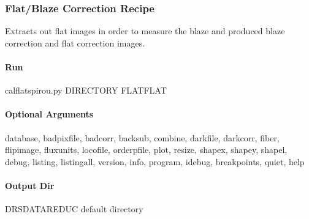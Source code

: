 \documentclass[a4paper,10pt,english]{report}
\begin{document}
\subsubsection{Flat/Blaze Correction Recipe}
\label{\detokenize{user/spirou/recipes/flat_blaze:flat-blaze-correction-recipe}}\label{\detokenize{user/spirou/recipes/flat_blaze:recipes-spirou-flat-blaze}}\label{\detokenize{user/spirou/recipes/flat_blaze::doc}}
Extracts out flat images in order to measure the blaze and produced blaze
correction and flat correction images.


\paragraph{Run}
\label{\detokenize{user/spirou/recipes/flat_blaze:run}}
\begin{sphinxVerbatim}[commandchars=\\\{\}]
cal\PYGZus{}flat\PYGZus{}spirou.py \PYG{o}{[}DIRECTORY\PYG{o}{]} \PYG{o}{[}FLAT\PYGZus{}FLAT\PYG{o}{]}
\end{sphinxVerbatim}


\paragraph{Optional Arguments}
\label{\detokenize{user/spirou/recipes/flat_blaze:optional-arguments}}
\begin{sphinxVerbatim}[commandchars=\\\{\}]
\PYGZhy{}\PYGZhy{}database, \PYGZhy{}\PYGZhy{}badpixfile, \PYGZhy{}\PYGZhy{}badcorr, \PYGZhy{}\PYGZhy{}backsub, \PYGZhy{}\PYGZhy{}combine,
\PYGZhy{}\PYGZhy{}darkfile, \PYGZhy{}\PYGZhy{}darkcorr,  \PYGZhy{}\PYGZhy{}fiber, \PYGZhy{}\PYGZhy{}flipimage, \PYGZhy{}\PYGZhy{}fluxunits,
\PYGZhy{}\PYGZhy{}locofile, \PYGZhy{}\PYGZhy{}orderpfile, \PYGZhy{}\PYGZhy{}plot, \PYGZhy{}\PYGZhy{}resize,
\PYGZhy{}\PYGZhy{}shapex, \PYGZhy{}\PYGZhy{}shapey, \PYGZhy{}\PYGZhy{}shapel,
\PYGZhy{}\PYGZhy{}debug, \PYGZhy{}\PYGZhy{}listing, \PYGZhy{}\PYGZhy{}listingall, \PYGZhy{}\PYGZhy{}version, \PYGZhy{}\PYGZhy{}info,
\PYGZhy{}\PYGZhy{}program, \PYGZhy{}\PYGZhy{}idebug, \PYGZhy{}\PYGZhy{}breakpoints, \PYGZhy{}\PYGZhy{}quiet, \PYGZhy{}\PYGZhy{}help
\end{sphinxVerbatim}


\paragraph{Output Dir}
\label{\detokenize{user/spirou/recipes/flat_blaze:output-dir}}
\begin{sphinxVerbatim}[commandchars=\\\{\}]
DRS\PYGZus{}DATA\PYGZus{}REDUC    default  directory
\end{sphinxVerbatim}
\end{document}
